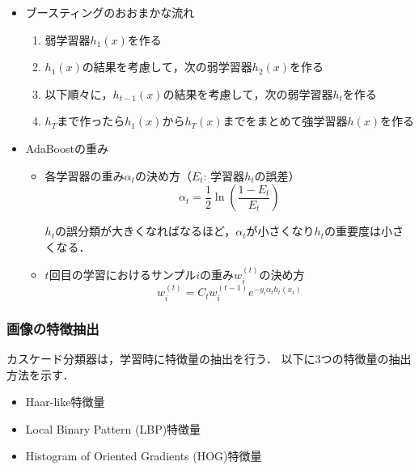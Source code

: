 \clearpage
\begin{itemize}
    \item ブースティングのおおまかな流れ\cite{suugaku}
        \begin{enumerate}
            \item $弱学習器h_1(x)を作る$
            \item $h_1(x)の結果を考慮して，次の弱学習器h_2(x)を作る$
            \item $以下順々に，h_{t-1}(x)の結果を考慮して，次の弱学習器h_tを作る$
            \item $h_Tまで作ったらh_1(x)からh_T(x)までをまとめて強学習器h(x)を作る$
        \end{enumerate}
    
    \item AdaBoostの重み
        \begin{itemize}
            \item 各学習器の重み$\alpha_t$の決め方（$E_t$: 学習器$h_t$の誤差）
                \begin{equation}
                    \alpha_t=\frac{1}{2}\ln(\frac{1-E_t}{E_t})
                \end{equation}
                

                $h_t$の誤分類が大きくなればなるほど，$\alpha_t$が小さくなり$h_t$の重要度は小さくなる．

            \item $t$回目の学習におけるサンプル$i$の重み$w_i^{(t)}$の決め方
                \begin{equation}
                    w_i^{(t)}=C_tw_i^{(t-1)}e^{-y_i\alpha_th_t(x_i)}
                \end{equation}
            
        \end{itemize}
\end{itemize}


\subsubsection{画像の特徴抽出}
カスケード分類器は，学習時に特徴量の抽出を行う． 
以下に3つの特徴量の抽出方法を示す．

\begin{itemize}
    \item Haar-like特徴量
    \item Local Binary Pattern (LBP)特徴量
    \item Histogram of Oriented Gradients (HOG)特徴量
\end{itemize}

